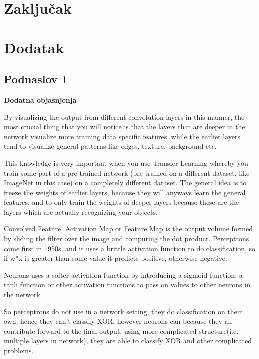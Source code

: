 \documentclass[a4paper]{article}
\begin{document}
\newpage

\section{Zaključak}
\label{sec:zakljucak}

\newpage

\appendix
 


\newpage

\appendix
\section{Dodatak}
\subsection{Podnaslov 1}

\textbf{Dodatna objasnjenja} %


By visualizing the output from different convolution layers in this manner, the most crucial thing that you will notice is that the layers that are deeper in the network visualize more training data specific features, while the earlier layers tend to visualize general patterns like edges, texture, background etc.

This knowledge is very important when you use Transfer Learning whereby you train some part of a pre-trained network (pre-trained on a different dataset, like ImageNet in this case) on a completely different dataset. The general idea is to freeze the weights of earlier layers, because they will anyways learn the general features, and to only train the weights of deeper layers because these are the layers which are actually recognizing your objects.

Convolved Feature, Activation Map or Feature Map is the output volume formed by sliding the filter over the image and computing the dot product.
Perceptrons come first in 1950s, and it uses a brittle activation function to do classification, so if w*x is greater than some value it predicts positive, otherwise negative.

Neurons uses a softer activation function by introducing a sigmoid function, a tanh function or other activation functions to pass on values to other neurons in the network.

So perceptrons do not use in a network setting, they do classification on their own, hence they can’t classify XOR, however neurons can because they all contribute forward to the final output, using more complicated structure(i.e. multiple layers in network), they are able to classify XOR and other complicated problems.
\end{document}
